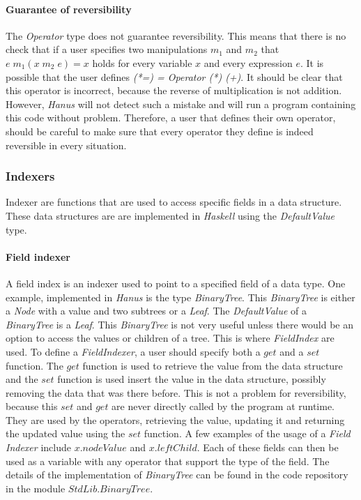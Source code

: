 \documentclass[12pt,a4paper]{article}
\begin{document}
	\paragraph{Guarantee of reversibility}
	The \textit{Operator} type does not guarantee reversibility. This means that there is no check that if a user specifies two manipulations $m_1$ and $m_2$ that $e \; m_1 (x \; m_2 \; e) = x$ holds for every variable $x$ and every expression $e$. It is possible that the user defines \textit{ (*=) = Operator (*) (+)}. It should be clear that this operator is incorrect, because the reverse of multiplication is not addition. However, \textit{Hanus} will not detect such a mistake and will run a program containing this code without problem. Therefore, a user that defines their own operator, should be careful to make sure that every operator they define is indeed reversible in every situation. 
	\subsubsection{Indexers}	
	Indexer are functions that are used to access specific fields in a data structure. These data structures are are implemented in \textit{Haskell} using the \textit{DefaultValue} type.
	\paragraph{Field indexer}
	A field index is an indexer used to point to a specified field of a data type. One example, implemented in \textit{Hanus} is the type \textit{BinaryTree}. This \textit{BinaryTree} is either a \textit{Node} with a value and two subtrees or a \textit{Leaf}. The \textit{DefaultValue} of a \textit{BinaryTree} is a \textit{Leaf}. This \textit{BinaryTree} is not very useful unless there would be an option to access the values or children of a tree. This is where \textit{FieldIndex} are used. To define a \textit{FieldIndexer}, a user should specify both a $get$ and a $set$ function. The $get$ function is used to retrieve the value from the data structure and the $set$ function is used insert the value in the data structure, possibly removing the data that was there before. This is not a problem for reversibility, because this $set$ and $get$ are never directly called by the program at runtime. They are used by the operators, retrieving the value, updating it and returning the updated value using the $set$ function. A few examples of the usage of a \textit{Field Indexer} include $x.nodeValue$ and $x.leftChild$. Each of these fields can then be used as a variable with any operator that support the type of the field.  The details of the implementation of \textit{BinaryTree} can be found in the code repository in the module $StdLib.BinaryTree$.
\end{document}
